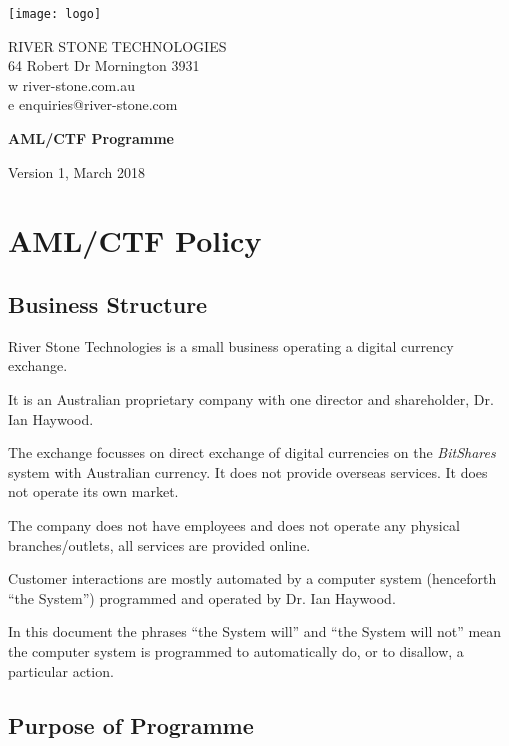 \documentclass[12pt]{report}
\begin{document}
\texttt{[image: logo]} \parbox[b]{5in}{\sffamily RIVER STONE TECHNOLOGIES \\
  64 Robert Dr Mornington 3931\\ w river-stone.com.au \\ e enquiries@river-stone.com }

\rmfamily
\vspace{1.5in}

\begin{center}
  {\Huge \bfseries AML/CTF Programme}
  \vspace{1in}

  {\large Version 1, March 2018}
 \end{center}
\setcounter{page}{1}                    %

 
\renewcommand{\thechapter}{\Alph{chapter}}
\def\labelsection{\thechapter \thesection}

\chapter{AML/CTF Policy}

\section{Business Structure}

River Stone Technologies is  a small business operating a digital currency exchange.

It is an Australian proprietary company with one director and shareholder,
Dr. Ian Haywood.

The exchange focusses on direct exchange of digital currencies on
the \emph{BitShares} system with Australian currency. It does
not provide overseas services. It does not operate its own market.

The company does not have employees and does not operate any physical
branches/outlets, all services are provided online.

Customer interactions are mostly automated by a computer system
(henceforth ``the System'') programmed and operated by Dr. Ian Haywood.

In this document the phrases ``the System will'' and ``the System will not'' mean the
computer system is programmed to automatically do, or to disallow, a particular action.

\section{Purpose of Programme}
\end{document}
